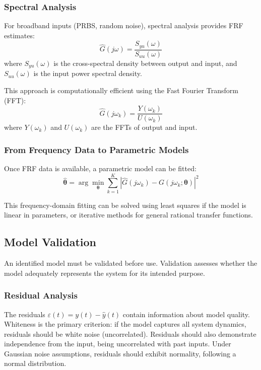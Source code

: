 \subsubsection{Spectral Analysis}

For broadband inputs (PRBS, random noise), spectral analysis provides FRF estimates:
\begin{equation}
\hat{G}(j\omega) = \frac{S_{yu}(\omega)}{S_{uu}(\omega)}
\label{eq:spectral_frf}
\end{equation}
where $S_{yu}(\omega)$ is the cross-spectral density between output and input, and $S_{uu}(\omega)$ is the input power spectral density.

This approach is computationally efficient using the Fast Fourier Transform (FFT):
\begin{equation}
\hat{G}(j\omega_k) = \frac{Y(\omega_k)}{U(\omega_k)}
\label{eq:fft_frf}
\end{equation}
where $Y(\omega_k)$ and $U(\omega_k)$ are the FFTs of output and input.

\subsubsection{From Frequency Data to Parametric Models}

Once FRF data is available, a parametric model can be fitted:
\begin{equation}
\hat{\boldsymbol{\theta}} = \arg\min_{\boldsymbol{\theta}} \sum_{k=1}^{K} \left| \hat{G}(j\omega_k) - G(j\omega_k; \boldsymbol{\theta}) \right|^2
\label{eq:freq_fitting}
\end{equation}

This frequency-domain fitting can be solved using least squares if the model is linear in parameters, or iterative methods for general rational transfer functions.

\subsection{Model Validation}
\label{subsec:validation}

An identified model must be validated before use. Validation assesses whether the model adequately represents the system for its intended purpose.

\subsubsection{Residual Analysis}

The residuals $\varepsilon(t) = y(t) - \hat{y}(t)$ contain information about model quality. Whiteness is the primary criterion: if the model captures all system dynamics, residuals should be white noise (uncorrelated). Residuals should also demonstrate independence from the input, being uncorrelated with past inputs. Under Gaussian noise assumptions, residuals should exhibit normality, following a normal distribution.

